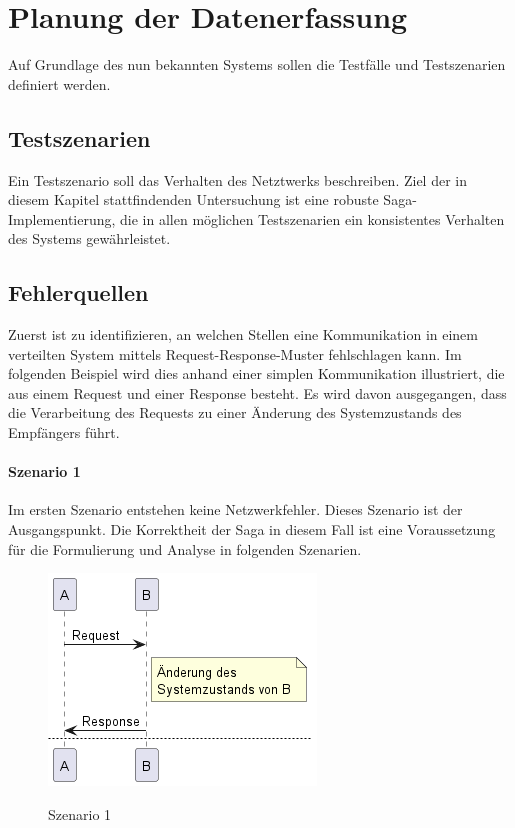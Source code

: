 \section{Planung der Datenerfassung}
Auf Grundlage des nun bekannten Systems sollen die Testfälle und Testszenarien definiert werden.

\subsection{Testszenarien}
Ein Testszenario soll das Verhalten des Netztwerks beschreiben. Ziel der in diesem Kapitel stattfindenden Untersuchung ist eine robuste Saga-Implementierung, die in allen möglichen Testszenarien ein konsistentes Verhalten des Systems gewährleistet. 

\subsection{Fehlerquellen}
Zuerst ist zu identifizieren, an welchen Stellen eine Kommunikation in einem verteilten System mittels Request-Response-Muster fehlschlagen kann. Im folgenden Beispiel wird dies anhand einer simplen Kommunikation illustriert, die aus einem Request und einer Response besteht. Es wird davon ausgegangen, dass die Verarbeitung des Requests zu einer Änderung des Systemzustands des Empfängers führt. 

\paragraph*{Szenario 1}
Im ersten Szenario entstehen keine Netzwerkfehler. Dieses Szenario ist der Ausgangspunkt. Die Korrektheit der Saga in diesem Fall ist eine Voraussetzung für die Formulierung und Analyse in folgenden Szenarien. 

\begin{figure}[H]
	\centering
	\includegraphics[width=.4\linewidth]{figures/ChapterVersuchsvorbereitung/TestSzenarien-0.png}
	\label{fig:Testszenario1}
	\caption{Szenario 1}
\end{figure}
\FloatBarrier

